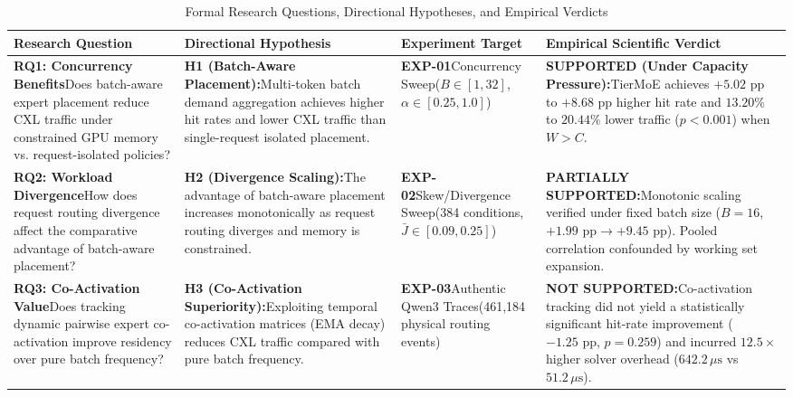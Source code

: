 \documentclass[10pt,journal,compsoc]{IEEEtran}
\begin{document}
\begin{table}[t]
\caption{Formal Research Questions, Directional Hypotheses, and Empirical Verdicts}
\label{tab:rq_hypotheses}
\centering
\begin{tabular}{@{}p{3.8cm}p{5.5cm}p{2.2cm}p{5.0cm}@{}}
\toprule
\textbf{Research Question} & \textbf{Directional Hypothesis} & \textbf{Experiment Target} & \textbf{Empirical Scientific Verdict} \\
\midrule
\textbf{RQ1: Concurrency Benefits}\newline Does batch-aware expert placement reduce CXL traffic under constrained GPU memory vs. request-isolated policies? & \textbf{H1 (Batch-Aware Placement):}\newline Multi-token batch demand aggregation achieves higher hit rates and lower CXL traffic than single-request isolated placement. & \textbf{EXP-01}\newline Concurrency Sweep\newline ($B \in [1, 32]$, $\alpha \in [0.25, 1.0]$) & \textbf{SUPPORTED (Under Capacity Pressure):}\newline TierMoE achieves $+5.02\text{ pp}$ to $+8.68\text{ pp}$ higher hit rate and $13.20\%$ to $20.44\%$ lower traffic ($p < 0.001$) when $W > C$. \\
\midrule
\textbf{RQ2: Workload Divergence}\newline How does request routing divergence affect the comparative advantage of batch-aware placement? & \textbf{H2 (Divergence Scaling):}\newline The advantage of batch-aware placement increases monotonically as request routing diverges and memory is constrained. & \textbf{EXP-02}\newline Skew/Divergence Sweep\newline (384 conditions, $\bar{J} \in [0.09, 0.25]$) & \textbf{PARTIALLY SUPPORTED:}\newline Monotonic scaling verified under fixed batch size ($B=16$, $+1.99\text{ pp} \to +9.45\text{ pp}$). Pooled correlation confounded by working set expansion. \\
\midrule
\textbf{RQ3: Co-Activation Value}\newline Does tracking dynamic pairwise expert co-activation improve residency over pure batch frequency? & \textbf{H3 (Co-Activation Superiority):}\newline Exploiting temporal co-activation matrices (EMA decay) reduces CXL traffic compared with pure batch frequency. & \textbf{EXP-03}\newline Authentic Qwen3 Traces\newline (461,184 physical routing events) & \textbf{NOT SUPPORTED:}\newline Co-activation tracking did not yield a statistically significant hit-rate improvement ($-1.25\text{ pp}$, $p=0.259$) and incurred $12.5\times$ higher solver overhead ($642.2\,\mu\text{s}$ vs $51.2\,\mu\text{s}$). \\

\end{tabular}
\end{table}
\end{document}
